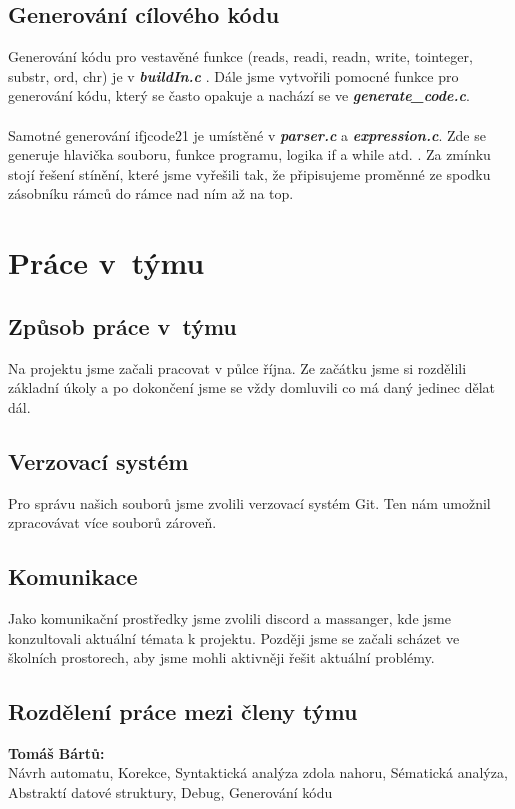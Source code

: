 \documentclass[12pt, letterpaper]{article}
\begin{document}
	\subsection{Generování cílového kódu}
    Generování kódu pro vestavěné funkce (reads, readi, readn, write, tointeger, substr, ord, chr) je v \textbf{\textit{buildIn.c}} . Dále jsme vytvořili pomocné funkce pro generování kódu, který se často opakuje a nachází se ve \textbf{\textit{generate\_code.c}}.\\\\
    Samotné generování ifjcode21 je umístěné v \textbf{\textit{parser.c}} a \textbf{\textit{expression.c}}. Zde se generuje hlavička souboru, funkce programu, logika if a while atd. . Za zmínku stojí řešení stínění, které jsme vyřešili tak, že připisujeme proměnné ze spodku zásobníku rámců do rámce nad ním až na top.
	\section{Práce v~týmu}

	\subsection{Způsob práce v~týmu}
    
    \large
    Na projektu jsme začali pracovat v půlce října. Ze začátku jsme si rozdělili základní úkoly a po dokončení jsme se vždy domluvili co má daný jedinec dělat dál.
    
	\subsection{Verzovací systém}
    
    \large
    Pro správu našich souborů jsme zvolili verzovací systém Git. Ten nám umožnil zpracovávat více souborů zároveň.
    
	\subsection{Komunikace}
	\large
	Jako komunikační prostředky jsme zvolili discord a massanger, kde jsme konzultovali aktuální témata k projektu. Později jsme se začali scházet ve školních prostorech, aby jsme mohli aktivněji řešit aktuální problémy. 

	\subsection{Rozdělení práce mezi členy týmu}
	\Large 
	\textbf{Tomáš Bártů:}\\
	Návrh automatu, Korekce, Syntaktická analýza zdola nahoru, Sématická analýza, Abstraktí datové struktury, Debug, Generování kódu \\
\end{document}

